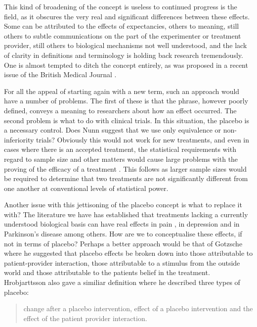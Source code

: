This kind of broadening of the concept is  useless to continued progress is the field, as it obscures the very real and significant differences between these effects. Some can be attributed to the effects of expectancies, others to meaning, still others to subtle communications on the part of the experimenter or treatment provider, still others to biological mechanisms not well understood, and the lack of clarity in definitions and terminology is holding back research tremendously. One is almost tempted to ditch the concept entirely, as was proposed in a recent issue of the British Medical Journal \cite{nunn2009s}. 

For all the appeal of starting again with a new term, such an approach would have a number of problems. The first of these is  that the phrase, however poorly defined, conveys a meaning to researchers about how an effect occurred. 
The second problem is what to do with clinical trials. In this situation, the placebo is a necessary control. Does Nunn suggest that we use only equivalence or non-inferiority trials? Obviously this would not work for new treatments, and even in cases where there is an accepted treatment, the statistical requirements with regard to sample size and other matters would cause large problems with the proving of the efficacy of a treatment \cite{Benedetti2008}. This follows as larger sample sizes would be required to determine that two treatments are not significantly different from one another at conventional levels of statistical power. %

Another issue with this jettisoning of the placebo concept is what to replace it with? The literature we have has established that  treatments lacking a currently understood biological basis can have real effects \cite{Meissner2007}  in pain \cite{Vase2002} , in depression \cite{Kirsch2002a}  and in Parkinson's disease \cite{Benedetti2004a} among others. How are we to conceptualise these effects, if not in terms of placebo? Perhaps a better approach would be that of Gotzsche \cite{Gotzsche1995} where he suggested that placebo effects be broken down into those attributable to patient-provider interaction, those attributable to a stimulus from the outside world and those attributable to the patients belief in the treatment. Hrobjarttsson also gave a similiar definition where he described three types of placebo:

\begin{quotation}
change after a placebo intervention, effect of a placebo intervention and the effect of the patient provider interaction. 
\end{quotation}

